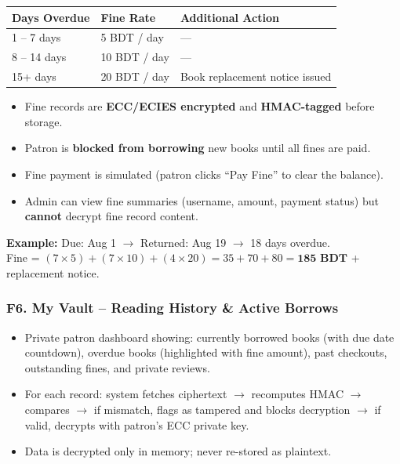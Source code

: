 \documentclass[12pt]{article}
\begin{document}
\begin{center}
\begin{tabular}{lll}
    \toprule
    \textbf{Days Overdue} & \textbf{Fine Rate} & \textbf{Additional Action} \\
    \midrule
    1 -- 7 days   & 5 BDT / day  & --- \\
    8 -- 14 days  & 10 BDT / day & --- \\
    15+ days      & 20 BDT / day & Book replacement notice issued \\
    \bottomrule
\end{tabular}
\end{center}

\begin{itemize}
    \item Fine records are \textbf{ECC/ECIES encrypted} and \textbf{HMAC-tagged} before storage.
    \item Patron is \textbf{blocked from borrowing} new books until all fines are paid.
    \item Fine payment is simulated (patron clicks ``Pay Fine'' to clear the balance).
    \item Admin can view fine summaries (username, amount, payment status) but \textbf{cannot} decrypt fine record content.
\end{itemize}

\textbf{Example:} Due: Aug 1 $\rightarrow$ Returned: Aug 19 $\rightarrow$ 18 days overdue.\\
Fine = $(7 \times 5) + (7 \times 10) + (4 \times 20) = 35 + 70 + 80 = \textbf{185\ BDT}$ + replacement notice.

\subsubsection{F6. My Vault -- Reading History \& Active Borrows}
\begin{itemize}
    \item Private patron dashboard showing: currently borrowed books (with due date countdown), overdue books (highlighted with fine amount), past checkouts, outstanding fines, and private reviews.
    \item For each record: system fetches ciphertext $\rightarrow$ recomputes HMAC $\rightarrow$ compares $\rightarrow$ if mismatch, flags as tampered and blocks decryption $\rightarrow$ if valid, decrypts with patron's ECC private key.
    \item Data is decrypted only in memory; never re-stored as plaintext.
\end{itemize}
\end{document}
